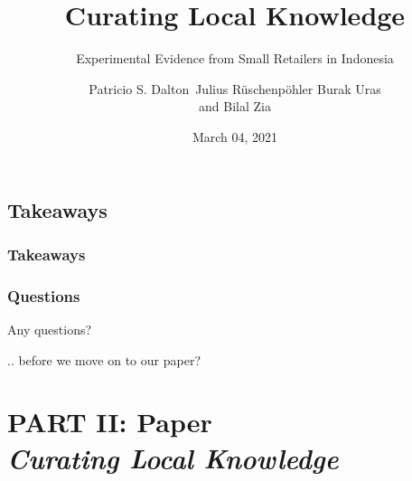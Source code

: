 \documentclass[hideothersubsections, usenames,dvipsnames,11pt]{beamer}
\newenvironment{itemize_3pt}{\itemize\addtolength{\itemsep}{3pt}}{\enditemize}
\begin{document}
\subsection{Takeaways}

\begin{frame}
\frametitle{Takeaways}
	\begin{itemize_3pt}
    \item
   	\vspace{0.10in}
\end{itemize_3pt}
\end{frame}

\begin{frame}
\frametitle{Questions}
	\textcolor{bdf}{Any questions?}
	\begin{itemize_3pt}
	\item[] .. before we move on to our paper?
	\end{itemize_3pt}
\end{frame}




\title[]{Curating Local Knowledge}
\subtitle{Experimental Evidence from Small Retailers in Indonesia}

\author[]
{Patricio S. Dalton\
Julius R{\"u}schenp{\"o}hler
Burak Uras\inst{1}\\and
Bilal Zia}


\date{March 04, 2021}


\section{\textbf{PART II: Paper} \\ \quad \emph{Curating Local Knowledge}}


\begin{frame}
\titlepage
\end{frame}
\end{document}
